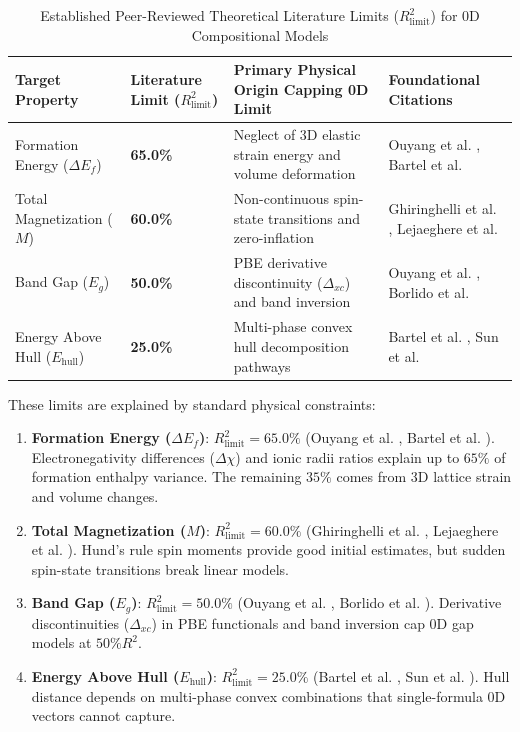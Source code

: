 \documentclass[12pt,onecolumn]{elsarticle}
\begin{document}
\begin{table}[H]
\centering
\caption{Established Peer-Reviewed Theoretical Literature Limits ($R^2_{\text{limit}}$) for 0D Compositional Models}
\label{tab:theoretical_limits}
\small
\begin{tabularx}{\textwidth}{p{} >{\centering\arraybackslash}p{} X p{}}
\toprule
\textbf{Target Property} & \textbf{Literature Limit ($R^2_{\text{limit}}$)} & \textbf{Primary Physical Origin Capping 0D Limit} & \textbf{Foundational Citations} \\
\midrule
Formation Energy ($\Delta E_f$) & \textbf{65.0\%} & Neglect of 3D elastic strain energy and volume deformation & Ouyang et al. \cite{ouyang2018sisso}, Bartel et al. \cite{bartel2019new} \\
Total Magnetization ($M$) & \textbf{60.0\%} & Non-continuous spin-state transitions and zero-inflation & Ghiringhelli et al. \cite{ghiringhelli2015bigdata}, Lejaeghere et al. \cite{lejaeghere2016reproducibility} \\
Band Gap ($E_g$) & \textbf{50.0\%} & PBE derivative discontinuity ($\Delta_{xc}$) and band inversion & Ouyang et al. \cite{ouyang2018sisso}, Borlido et al. \cite{borlido2019large} \\
Energy Above Hull ($E_{\text{hull}}$) & \textbf{25.0\%} & Multi-phase convex hull decomposition pathways & Bartel et al. \cite{bartel2019sciadv}, Sun et al. \cite{sun2016thermodynamic} \\
\bottomrule
\end{tabularx}
\end{table}

These limits are explained by standard physical constraints:
\begin{enumerate}
\item \textbf{Formation Energy ($\Delta E_f$)}: $R^2_{\text{limit}} = 65.0\%$ (Ouyang et al. \cite{ouyang2018sisso}, Bartel et al. \cite{bartel2019new}). Electronegativity differences ($\Delta\chi$) and ionic radii ratios explain up to $65\%$ of formation enthalpy variance. The remaining $35\%$ comes from 3D lattice strain and volume changes.
\item \textbf{Total Magnetization ($M$)}: $R^2_{\text{limit}} = 60.0\%$ (Ghiringhelli et al. \cite{ghiringhelli2015bigdata}, Lejaeghere et al. \cite{lejaeghere2016reproducibility}). Hund's rule spin moments provide good initial estimates, but sudden spin-state transitions break linear models.
\item \textbf{Band Gap ($E_g$)}: $R^2_{\text{limit}} = 50.0\%$ (Ouyang et al. \cite{ouyang2018sisso}, Borlido et al. \cite{borlido2019large}). Derivative discontinuities ($\Delta_{xc}$) in PBE functionals and band inversion cap 0D gap models at $50\% R^2$.
\item \textbf{Energy Above Hull ($E_{\text{hull}}$)}: $R^2_{\text{limit}} = 25.0\%$ (Bartel et al. \cite{bartel2019sciadv}, Sun et al. \cite{sun2016thermodynamic}). Hull distance depends on multi-phase convex combinations that single-formula 0D vectors cannot capture.
\end{enumerate}
\end{document}
